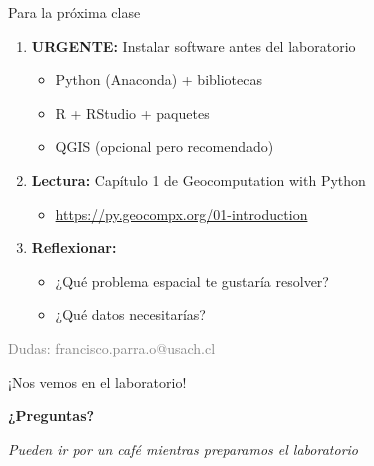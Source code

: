 \documentclass[10pt]{beamer}
\begin{document}
\begin{frame}{Para la próxima clase}
    \begin{enumerate}
        \item \textcolor{red}{} \textbf{URGENTE:} Instalar software antes del laboratorio
        \begin{itemize}
            \item Python (Anaconda) + bibliotecas
            \item R + RStudio + paquetes
            \item QGIS (opcional pero recomendado)
        \end{itemize}
        
        \item \textcolor{blue}{} \textbf{Lectura:} Capítulo 1 de Geocomputation with Python
        \begin{itemize}
            \item \url{https://py.geocompx.org/01-introduction}
        \end{itemize}
        
        \item \textcolor{green}{} \textbf{Reflexionar:} 
        \begin{itemize}
            \item ¿Qué problema espacial te gustaría resolver?
            \item ¿Qué datos necesitarías?
        \end{itemize}
    \end{enumerate}
    
    \vspace{0.5cm}
    \begin{center}
        \textcolor{gray}{ Dudas: francisco.parra.o@usach.cl}
    \end{center}
\end{frame}

\begin{frame}{¡Nos vemos en el laboratorio!}
    \begin{center}
        \Large{\textbf{¿Preguntas?}}
        
        \vspace{1cm}
        
        
        \vspace{1cm}
        
        \textcolor{usachred}{} \textit{Pueden ir por un café mientras preparamos el laboratorio}
    \end{center}
\end{frame}
\end{document}
